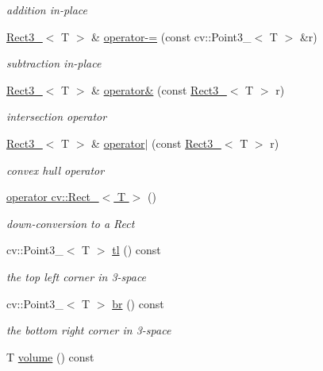 \begin{DoxyCompactItemize}
\begin{DoxyCompactList}\small\item\em addition in-\/place \end{DoxyCompactList}\item 
\hyperlink{classRect3__}{Rect3\+\_\+}$<$ T $>$ \& \hyperlink{classRect3___a3a626255017a7cef76e065c51ef1504f}{operator-\/=} (const cv\+::\+Point3\+\_\+$<$ T $>$ \&r)
\begin{DoxyCompactList}\small\item\em subtraction in-\/place \end{DoxyCompactList}\item 
\hyperlink{classRect3__}{Rect3\+\_\+}$<$ T $>$ \& \hyperlink{classRect3___a24609371fde6d5c8383dbb210bb75b5e}{operator\&} (const \hyperlink{classRect3__}{Rect3\+\_\+}$<$ T $>$ r)
\begin{DoxyCompactList}\small\item\em intersection operator \end{DoxyCompactList}\item 
\hyperlink{classRect3__}{Rect3\+\_\+}$<$ T $>$ \& \hyperlink{classRect3___a0f988dcf6a9ad19243844abf4acba653}{operator$\vert$} (const \hyperlink{classRect3__}{Rect3\+\_\+}$<$ T $>$ r)
\begin{DoxyCompactList}\small\item\em convex hull operator \end{DoxyCompactList}\item 
\hyperlink{classRect3___a4f49b82908b88ed545690bfff932ea30}{operator cv\+::\+Rect\+\_\+$<$ T $>$} ()
\begin{DoxyCompactList}\small\item\em down-\/conversion to a Rect \end{DoxyCompactList}\item 
cv\+::\+Point3\+\_\+$<$ T $>$ \hyperlink{classRect3___a8df208aa3d316ea706a529db292d1a0f}{tl} () const 
\begin{DoxyCompactList}\small\item\em the top left corner in 3-\/space \end{DoxyCompactList}\item 
cv\+::\+Point3\+\_\+$<$ T $>$ \hyperlink{classRect3___a253d895d86ec7718351f29ff3cd0cd27}{br} () const 
\begin{DoxyCompactList}\small\item\em the bottom right corner in 3-\/space \end{DoxyCompactList}\item 
T \hyperlink{classRect3___a766842fae2533d47ccf9b7fb428670c8}{volume} () const 

\end{DoxyCompactItemize}
